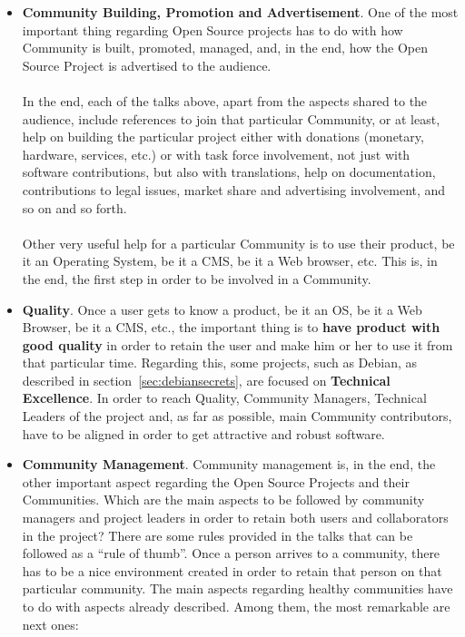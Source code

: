 \documentclass[11pt]{article}
\begin{document}
\begin{itemize}
\item{\textbf{Community Building, Promotion and Advertisement}}. One of the most important thing regarding Open Source projects has to do with how Community is built, promoted, managed, and, in the end, how the Open Source Project is advertised to the audience.\\
\\
In the end, each of the talks above, apart from the aspects shared to the audience, include references to join that particular Community, or at least, help on building the particular project either with donations (monetary, hardware, services, etc.) or with task force involvement, not just with software contributions, but also with translations, help on documentation, contributions to legal issues, market share and advertising involvement, and so on and so forth.\\
\\
Other very useful help for a particular Community is to use their product, be it an Operating System, be it a CMS, be it a Web browser, etc. This is, in the end, the first step in order to be involved in a Community.
\item{\textbf{Quality}}. Once a user gets to know a product, be it an OS, be it a Web Browser, be it a CMS, etc., the important thing is to \textbf{have product with good quality} in order to retain the user and make him or her to use it from that particular time. Regarding this, some projects, such as Debian, as described in section~\ref{sec:debiansecrets}, are focused on \textbf{Technical Excellence}. In order to reach Quality, Community Managers, Technical Leaders of the project and, as far as possible, main Community contributors, have to be aligned in order to get attractive and robust software.
\item{\textbf{Community Management}}. Community management is, in the end, the other important aspect regarding the Open Source Projects and their Communities. Which are the main aspects to be followed by community managers and project leaders in order to retain both users and collaborators in the project? There are some rules provided in the talks that can be followed as a ``rule of thumb''. Once a person arrives to a community, there has to be a nice environment created in order to retain that person on that particular community. The main aspects regarding healthy communities have to do with aspects already described. Among them, the most remarkable are next ones:
\begin{itemize}\itemsep0pt

\end{itemize}
\end{itemize}
\end{document}
